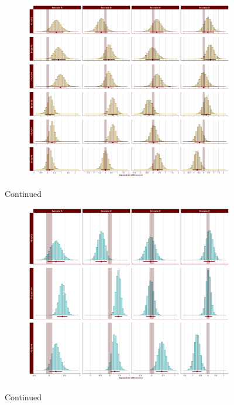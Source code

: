\documentclass[
  english,
  man]{apa6}
\begin{document}
\begin{appendix}
\medskip

\begin{figure}[ht]\ContinuedFloat
\centering
\begin{subfigure}{1\textwidth}
\includegraphics[width=\linewidth]{Figures/SE2_last_scenario_comparisons_C.png}
\label{fig:last-scenario-comparisons-C}
\end{subfigure}
\caption[]{Continued}
\end{figure}

\medskip

\begin{figure}[ht]\ContinuedFloat
\centering
\begin{subfigure}{1\textwidth}
\includegraphics[width=\linewidth]{Figures/SE2_last_scenario_comparisons_D.png}
\label{fig:last-scenario-comparisons-D}
\end{subfigure}
\caption[]{Continued}
\label{fig:last-scenario-comparisons}
\end{figure}
\end{appendix}
\end{document}
